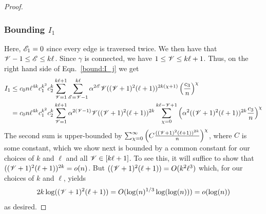 \begin{proof}
% 

\subsubsection{Bounding $I_1$}

Here, $\mathscr{E}_1 = 0$ since every edge is traversed twice.
We then have that 
$\mathscr{V} - 1 \leq \mathscr{E} \leq k\ell$. 
Since $\gamma$ is connected,
we have 
$1 \leq \mathscr{V} \leq k\ell+1$. 
Thus, on the right hand side of 
Eqn.~\eqref{bound:I_j} we get 
\begin{align*}
I_1 
&\leq 
c_0 n
\ell^{4k} 
c_1^{ k^2}
c_2^k
\sum_{\mathscr{V} = 1}^{k\ell+1} 
\sum_{\mathscr{E}=\mathscr{V}-1}^{k\ell} 
\alpha^{2\mathscr{E}}
\mathscr{V}
((\mathscr{V} + 1)^2 (\ell + 1))^{2k(\chi + 1)}
\left( \frac{c_3}{n} \right)^\chi
\\
&=
c_0 n
\ell^{4k} 
c_1^{ k^2}
c_2^k
\sum_{\mathscr{V} = 1}^{k\ell+1} 
\alpha^{2(\mathscr{V} - 1)}
\mathscr{V}
((\mathscr{V} + 1)^2 (\ell + 1))^{2k}
\sum_{\chi= 0}^{k\ell - \mathscr{V} + 1} 
\left( 
    \alpha^2
    ((\mathscr{V} + 1)^2 (\ell + 1))^{2k} 
    \frac{c_3}{n} 
\right)^\chi
\end{align*}
The second sum
is upper-bounded by 
$
\sum_{\chi=0}^\infty 
\left( C \frac{ ((\mathscr{V}+1)^2 (\ell+1) )^{2k} }{n} \right)^\chi
$,
where $C$ is some constant,
which we show next is bounded by a common constant for our choices of $k$ and $\ell$ 
and all $\mathscr{V} \in [k\ell + 1]$. 
To see this, it will suffice to show that 
$((\mathscr{V}+1)^2 (\ell+1) )^{2k}=o(n)$. 
But $((\mathscr{V}+1)^2 (\ell+1) ) = O(k^2 \ell^3)$
which, for our choices of $k$ and $\ell$, yields
\[
2k \log( (\mathscr{V}+1)^2 (\ell+1) )=O({\log(n)^{1/3}}\log(\log(n)))=o(\log(n))
\]
as desired.


\end{proof}
